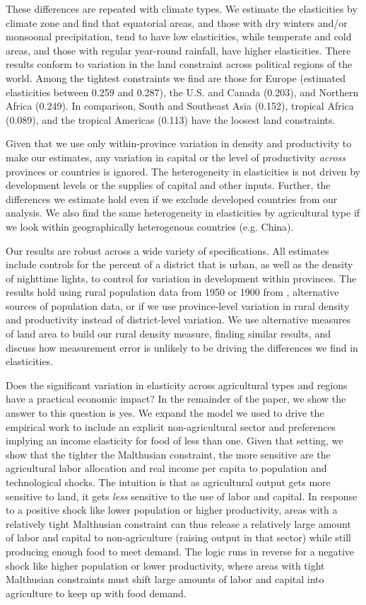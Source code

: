 \documentclass[11pt]{article}
\begin{document}
These differences are repeated with climate types. We estimate the elasticities by climate zone and find that equatorial areas, and those with dry winters and/or monsoonal precipitation, tend to have low elasticities, while temperate and cold areas, and those with regular year-round rainfall, have higher elasticities. There results conform to variation in the land constraint across political regions of the world. Among the tightest constraints we find are those for Europe (estimated elasticities between 0.259 and 0.287), the U.S. and Canada (0.203), and Northern Africa (0.249). In comparison, South and Southeast Asia (0.152), tropical Africa (0.089), and the tropical Americas (0.113) have the loosest land constraints. 

Given that we use only within-province variation in density and productivity to make our estimates, any variation in capital or the level of productivity \textit{across} provinces or countries is ignored. The heterogeneity in elasticities is not driven by development levels or the supplies of capital and other inputs. Further, the differences we estimate hold even if we exclude developed countries from our analysis. We also find the same heterogeneity in elasticities by agricultural type if we look within geographically heterogenous countries (e.g. China).

Our results are robust across a wide variety of specifications. All estimates include controls for the percent of a district that is urban, as well as the density of nighttime lights, to control for variation in development within provinces. The results hold using rural population data from 1950 or 1900 from \cite{hyde31}, alternative sources of population data, or if we use province-level variation in rural density and productivity instead of district-level variation. We use alternative measures of land area to build our rural density measure, finding similar results, and discuss how measurement error is unlikely to be driving the differences we find in elasticities.

Does the significant variation in elasticity across agricultural types and regions have a practical economic impact? In the remainder of the paper, we show the answer to this question is yes. We expand the model we used to drive the empirical work to include an explicit non-agricultural sector and preferences implying an income elasticity for food of less than one. Given that setting, we show that the tighter the Malthusian constraint, the more sensitive are the agricultural labor allocation and real income per capita to population and technological shocks. The intuition is that as agricultural output gets more sensitive to land, it gets \textit{less} sensitive to the use of labor and capital. In response to a positive shock like lower population or higher productivity, areas with a relatively tight Malthusian constraint can thus release a relatively large amount of labor and capital to non-agriculture (raising output in that sector) while still producing enough food to meet demand. The logic runs in reverse for a negative shock like higher population or lower productivity, where areas with tight Malthusian constraints must shift large amounts of labor and capital into agriculture to keep up with food demand.
\end{document}
